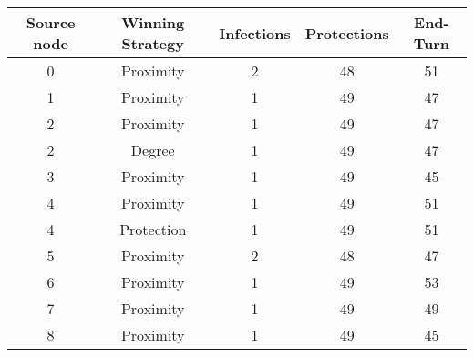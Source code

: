 \documentclass[results.tex]{subfiles}
\begin{document}
    \begin{center}
        \begin{tabular}{| c || c | c | c | c |}
            \hline
            {\bfseries Source node} & {\bfseries Winning Strategy} & {\bfseries Infections} & {\bfseries Protections}
            & {\bfseries End-Turn}
            \\  %
            \hline\hline
            0                       & Proximity                    & 2                      & 48                      & 51                   \\
            \hline
            1                       & Proximity                    & 1                      & 49                      & 47                   \\
            \hline
            2                       & Proximity                    & 1                      & 49                      & 47                   \\
            \hline
            2                       & Degree                       & 1                      & 49                      & 47                   \\
            \hline
            3                       & Proximity                    & 1                      & 49                      & 45                   \\
            \hline
            4                       & Proximity                    & 1                      & 49                      & 51                   \\
            \hline
            4                       & Protection                   & 1                      & 49                      & 51                   \\
            \hline
            5                       & Proximity                    & 2                      & 48                      & 47                   \\
            \hline
            6                       & Proximity                    & 1                      & 49                      & 53                   \\
            \hline
            7                       & Proximity                    & 1                      & 49                      & 49                   \\
            \hline
            8                       & Proximity                    & 1                      & 49                      & 45                   \\

\end{tabular}
\end{center}
\end{document}
